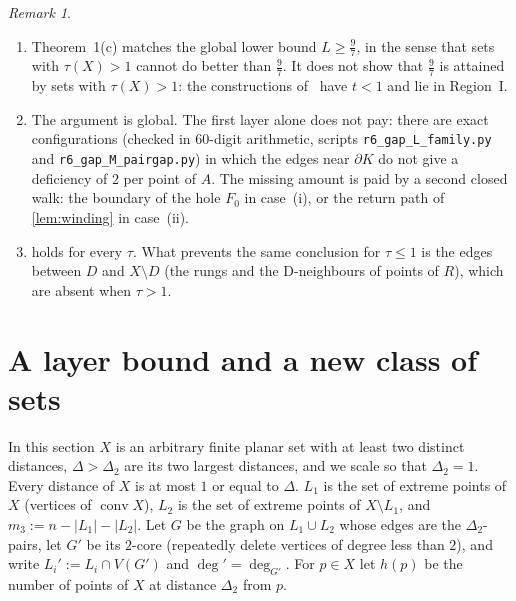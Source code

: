 \documentclass[11pt]{amsart}
\theoremstyle{definition}
\theoremstyle{remark}
\newtheorem{remark}[theorem]{Remark}
\newcommand{\Dt}{\Delta_2}
\newcommand{\conv}{\operatorname{conv}}
\begin{document}
\begin{remark}\label{rem:Eprime}
\begin{enumerate}[leftmargin=2em,label=(\alph*)]
\item Theorem~1(c) matches the global lower bound $L\ge\frac97$, in the sense that sets with $\tau(X)>1$ cannot do better than $\frac97$. It does not show that $\frac97$ is attained by sets with $\tau(X)>1$: the constructions of~\cite{ienjoymath} have $t<1$ and lie in Region~I.
\item The argument is global. The first layer alone does not pay: there are exact configurations (checked in $60$-digit arithmetic, scripts \texttt{r6\_gap\_L\_family.py} and \texttt{r6\_gap\_M\_pairgap.py}) in which the edges near $\partial K$ do not give a deficiency of $2$ per point of $A$. The missing amount is paid by a second closed walk: the boundary of the hole $F_0$ in case~(i), or the return path of \cref{lem:winding} in case~(ii).
\item {} holds for every $\tau$. What prevents the same conclusion for $\tau\le1$ is the edges between $D$ and $X\setminus D$ (the rungs and the D-neighbours of points of $R$), which are absent when $\tau>1$.
\end{enumerate}
\end{remark}

\section{A layer bound and a new class of sets}\label{sec:layers}

In this section $X$ is an arbitrary finite planar set with at least two distinct distances, $\Delta>\Dt$ are its two largest distances, and we scale so that $\Dt=1$. Every distance of $X$ is at most $1$ or equal to $\Delta$. $L_1$ is the set of extreme points of $X$ (vertices of $\conv X$), $L_2$ is the set of extreme points of $X\setminus L_1$, and $m_3:=n-|L_1|-|L_2|$. Let $G$ be the graph on $L_1\cup L_2$ whose edges are the $\Dt$-pairs, let $G'$ be its $2$-core (repeatedly delete vertices of degree less than $2$), and write $L_i':=L_i\cap V(G')$ and $\deg'=\deg_{G'}$. For $p\in X$ let $h(p)$ be the number of points of $X$ at distance $\Dt$ from $p$.
\end{document}
